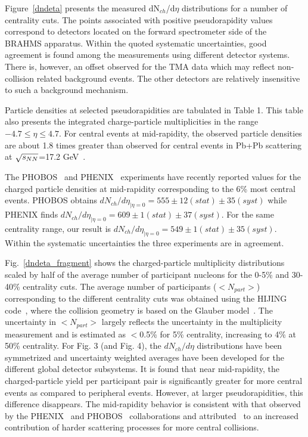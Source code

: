 \documentclass[singlespacing]{elsart}
\begin{document}
Figure~\ref{dndeta} 
presents the measured dN$_{ch}$/d$\eta$ distributions for a number of
centrality cuts.  
The points associated with positive pseudorapidity values correspond
to detectors located on the forward spectrometer side of the 
BRAHMS apparatus. Within
the quoted systematic uncertainties, good
agreement is found among the  measurements using different detector systems. 
There is, however, an offset 
observed for the TMA data which may reflect non-collision related background 
events. The other detectors are relatively insensitive to such a background
mechanism. 

Particle densities at selected pseudorapidities are tabulated in Table 1.
This table also presents the integrated charge-particle multiplicities
in the range $-4.7\le\eta\le4.7$.  For central
events at mid-rapidity, the observed particle densities are about 1.8 times 
greater than observed for central events in Pb+Pb scattering at 
$\sqrt{s_{\small{NN}}}$=17.2 GeV~\cite{deines00}.

The PHOBOS~\cite{back00} and PHENIX~\cite{adcox01} experiments have 
recently reported values for the charged particle densities at mid-rapidity
corresponding to the 6\% most central events. PHOBOS obtains 
$dN_{ch}/d\eta_{|\eta=0}=555\pm12(stat)\pm35(syst)$ while
PHENIX finds 
$dN_{ch}/d\eta_{|\eta=0}=609\pm1(stat)\pm37(syst)$.  For the
same centrality range, our result is
$dN_{ch}/d\eta_{|\eta=0}=549\pm1(stat)\pm35(syst)$. Within the systematic
uncertainties the three experiments are in agreement.

Fig.~\ref{dndeta_fragment} shows the 
charged-particle multiplicity distributions scaled by half of the 
average number of participant nucleons 
for the 0-5\% and 30-40\% centrality cuts.
The average number of participants ($<N_{part}>$) corresponding to the
different centrality cuts was obtained using the HIJING code~\cite{wang91}, 
where the
collision geometry is based on the Glauber model~\cite{glauber}.  
The uncertainty in $<N_{part}>$ largely reflects the uncertainty
in the multiplicity measurement and is estimated as $<$0.5\% for 5\% 
centrality, increasing to 4\% at 50\% centrality.
For Fig. 3 (and Fig. 4), the 
$dN_{ch}/d\eta$ distributions have been symmetrized and
uncertainty weighted averages have been
developed for the different global detector subsystems.
It is found that near mid-rapidity, the charged-particle yield per 
participant pair is significantly greater for more central events as
compared to peripheral events.  However, at larger pseudorapidities, this
difference disappears. The mid-rapidity behavior is consistent with that 
observed by the
PHENIX~\cite{adcox01} and PHOBOS~\cite{back01} collaborations 
and attributed~\cite{adcox01} 
to an increased contribution of harder scattering processes for more
central collisions. 
\end{document}
